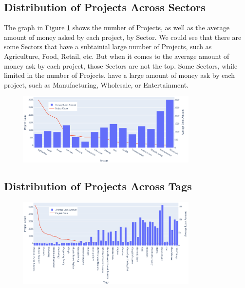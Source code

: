 \subsection{Distribution of Projects Across Sectors}

The graph in Figure \ref{fig:project-vs-sector} shows the number of Projects,
as well as the average amount of money asked by each project, by Sector.
We could see that there are some Sectors that have a subtainial large number of Projects, such as Agriculture, Food, Retail, etc.
But when it comes to the average amount of money ask by each project, those Sectors are not the top.
Some Sectors, while limited in the number of Projects, have a large amount of money ask by each project, such as Manufacturing, Wholesale, or Entertainment.


\begin{figure}[H]
	\centering
	\includegraphics[width=0.8\textwidth]{images/project-vs-sector.pdf}
	\caption{}
	\label{fig:project-vs-sector}
\end{figure}

\subsection{Distribution of Projects Across Tags}

\begin{figure}[H]
	\centering
	\includegraphics[width=0.8\textwidth]{images/project-vs-tag.pdf}
	\caption{}
	\label{fig:project-vs-tag}
\end{figure}

